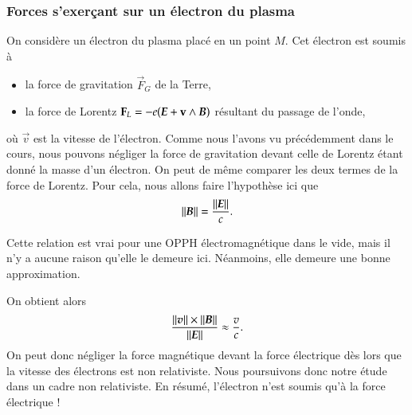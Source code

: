 \subsubsection{Forces s'exerçant sur un électron du plasma}
On considère un électron du plasma placé en un point $M$.
Cet électron est soumis à
\begin{itemize}
	\item la force de gravitation $\vec{F}_G$ de la Terre,
	\item la force de Lorentz $\vec{F}_L = -e(\vece + \vec{v} \wedge \vecb)$ 
	  résultant du passage de l'onde,
\end{itemize}
où $\vec{v}$ est la vitesse de l'électron. Comme nous l'avons vu précédemment
dans le cours, nous pouvons négliger la force de gravitation devant celle de Lorentz
étant donné la masse d'un électron. On peut de même comparer les deux
termes de la force de Lorentz. Pour cela, nous allons faire l'hypothèse ici que
\begin{equation*}
	||\vecb|| = \dfrac{||\vece||}{c}.
\end{equation*}

\begin{rem}
Cette relation est vrai pour une OPPH électromagnétique dans le vide, mais il n'y a
aucune raison qu'elle le demeure ici. Néanmoins, elle demeure une bonne approximation.
\end{rem}

On obtient alors 
\begin{equation*}
	\dfrac{||\vecv|| \times ||\vecb||}{||\vece||} \approx \dfrac{v}{c}.
\end{equation*}
On peut donc négliger la force magnétique devant la force électrique dès lors
que la vitesse des électrons est non relativiste. Nous poursuivons donc notre 
étude dans un cadre non relativiste. En résumé, l'électron n'est soumis qu'à la
force électrique !

